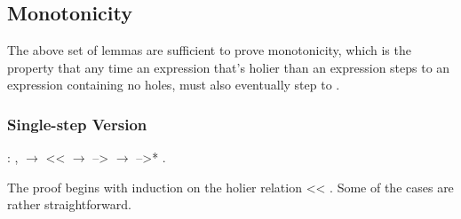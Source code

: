 \documentclass[12pt]{report}
\begin{document}
\subsection{Monotonicity}



The above set of lemmas are sufficient to prove monotonicity, which
is the property that any time an expression  that's
holier than an expression  steps to an expression
 containing no holes,  must also
eventually step to . 

\subsubsection{Single-step Version}

\begin{coqdoccode}
\coqdocemptyline
\coqdocindent{1.00em}
  : \coqdockw{\ensuremath{\forall}}   ,\coqdoceol
\coqdocindent{2.00em}
  \ensuremath{\rightarrow}\coqdoceol
\coqdocindent{2.00em}
 <<  \ensuremath{\rightarrow}\coqdoceol
\coqdocindent{2.00em}
 -->  \ensuremath{\rightarrow}\coqdoceol
\coqdocindent{2.00em}
 -->* .\coqdoceol
\coqdocemptyline
\end{coqdoccode}

The proof begins with induction on the holier relation 
<< . Some of the cases are rather straightforward. 
\end{document}
